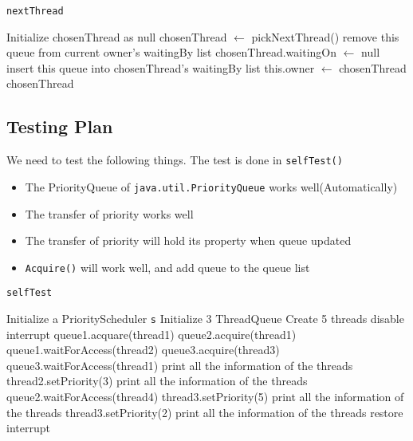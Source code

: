 \documentclass{article}
\begin{document}
\begin{spacing}{1.1}
\begin{algorithm}
  \caption{\texttt{nextThread}}
\begin{algorithmic}[1]
  \STATE Initialize chosenThread as null
  \STATE chosenThread $\leftarrow$ pickNextThread()
    \STATE remove this queue from current owner's waitingBy list
    \STATE chosenThread.waitingOn $\leftarrow$ null
    \STATE insert this queue into chosenThread's waitingBy list
  \ENDIF
  \STATE this.owner $\leftarrow$ chosenThread
\RETURN chosenThread
\end{algorithmic}
\end{algorithm}

\subsection{Testing Plan}
We need to test the following things. The test is done in \texttt{selfTest()}
\begin{itemize}
\item The PriorityQueue of \texttt{java.util.PriorityQueue} works well(Automatically)
\item The transfer of priority works well
\item The transfer of priority will hold its property when queue updated
\item \texttt{Acquire()} will work well, and add queue to the queue list
\end{itemize}

\begin{algorithm}
  \caption{\texttt{selfTest}}
\begin{algorithmic}[1]
  \STATE Initialize a PriorityScheduler \texttt{s}
  \STATE Initialize 3 ThreadQueue
  \STATE Create 5 threads
  \STATE disable interrupt
  \STATE
  \STATE queue1.acquare(thread1)
  \STATE queue2.acquire(thread1)
  \STATE queue1.waitForAccess(thread2)
  \STATE queue3.acquire(thread3)
  \STATE queue3.waitForAccess(thread1)
  \STATE print all the information of the threads
  \STATE
  \STATE thread2.setPriority(3)
  \STATE print all the information of the threads
  \STATE
  \STATE queue2.waitForAccess(thread4)
  \STATE thread3.setPriority(5)
  \STATE print all the information of the threads
  \STATE
  \STATE thread3.setPriority(2)
  \STATE print all the information of the threads
  \STATE
  \STATE restore interrupt
\end{algorithmic}
\end{algorithm}


\end{spacing}
\end{document}
